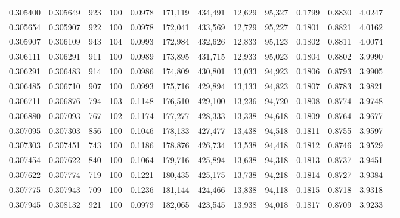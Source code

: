 \begin{tabular}{rrrrrrrrrrrrr}
0.305400 & 0.305649 &   923 & 100 &                                     0.0978 & 171,119 & 434,491 &  12,629 &  95,327 & 0.1799 & 0.8830 & 4.0247 \\
0.305654 & 0.305907 &   922 & 100 &                                     0.0978 & 172,041 & 433,569 &  12,729 &  95,227 & 0.1801 & 0.8821 & 4.0162 \\
0.305907 & 0.306109 &   943 & 104 &                                     0.0993 & 172,984 & 432,626 &  12,833 &  95,123 & 0.1802 & 0.8811 & 4.0074 \\
0.306111 & 0.306291 &   911 & 100 &                                     0.0989 & 173,895 & 431,715 &  12,933 &  95,023 & 0.1804 & 0.8802 & 3.9990 \\
0.306291 & 0.306483 &   914 & 100 &                                     0.0986 & 174,809 & 430,801 &  13,033 &  94,923 & 0.1806 & 0.8793 & 3.9905 \\
0.306485 & 0.306710 &   907 & 100 &                                     0.0993 & 175,716 & 429,894 &  13,133 &  94,823 & 0.1807 & 0.8783 & 3.9821 \\
0.306711 & 0.306876 &   794 & 103 &                                     0.1148 & 176,510 & 429,100 &  13,236 &  94,720 & 0.1808 & 0.8774 & 3.9748 \\
0.306880 & 0.307093 &   767 & 102 &                                     0.1174 & 177,277 & 428,333 &  13,338 &  94,618 & 0.1809 & 0.8764 & 3.9677 \\
0.307095 & 0.307303 &   856 & 100 &                                     0.1046 & 178,133 & 427,477 &  13,438 &  94,518 & 0.1811 & 0.8755 & 3.9597 \\
0.307303 & 0.307451 &   743 & 100 &                                     0.1186 & 178,876 & 426,734 &  13,538 &  94,418 & 0.1812 & 0.8746 & 3.9529 \\
0.307454 & 0.307622 &   840 & 100 &                                     0.1064 & 179,716 & 425,894 &  13,638 &  94,318 & 0.1813 & 0.8737 & 3.9451 \\
0.307622 & 0.307774 &   719 & 100 &                                     0.1221 & 180,435 & 425,175 &  13,738 &  94,218 & 0.1814 & 0.8727 & 3.9384 \\
0.307775 & 0.307943 &   709 & 100 &                                     0.1236 & 181,144 & 424,466 &  13,838 &  94,118 & 0.1815 & 0.8718 & 3.9318 \\
0.307945 & 0.308132 &   921 & 100 &                                     0.0979 & 182,065 & 423,545 &  13,938 &  94,018 & 0.1817 & 0.8709 & 3.9233 \\

\end{tabular}
